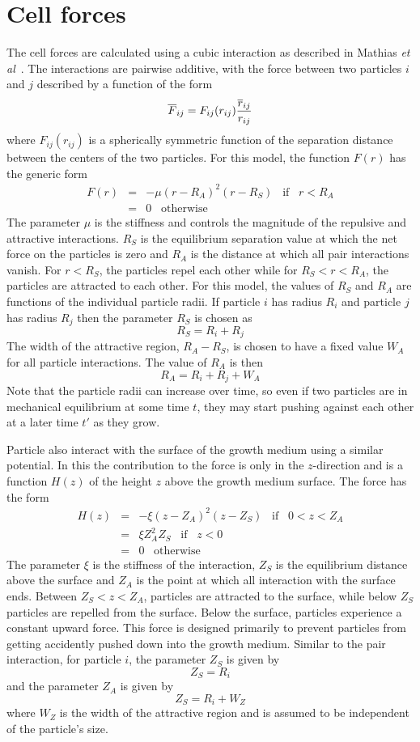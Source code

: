 \documentclass[12pt]{article}
\begin{document}
\section{Cell forces}
The cell forces are calculated using a cubic interaction as described in Mathias
{\em et al}~\cite{Mathias}. The interactions are pairwise
additive, with the force between two particles $i$ and $j$ described by a function of the form
\[
\overline{F}_{ij} = F_{ij}(r_{ij})\frac{\overline{r}_{ij}}{r_{ij}}
\]
where $F_{ij}(r_{ij})$ is a spherically symmetric function of the separation distance between the
centers of the two particles. For this model, the function $F(r)$ has the generic form
\begin{eqnarray*}
F(r) &=& -\mu(r-R_A)^2(r-R_S)\;\;\;\mbox{if}\;\;\;r<R_A \\
& = & 0\;\;\; \mbox{otherwise}
\end{eqnarray*}
The parameter $\mu$ is the stiffness and controls the magnitude of the repulsive and attractive
interactions. $R_S$ is the equilibrium separation value at which the net force on the particles is zero
and $R_A$ is the distance at which all pair interactions vanish. For $r<R_S$, the particles repel each
other while for $R_S<r<R_A$, the particles are attracted to each other. For this model, the values of
$R_S$ and $R_A$ are functions of the individual particle radii. If particle $i$ has radius $R_i$ and
particle $j$ has radius $R_j$ then the parameter $R_S$ is chosen as
\[
R_S = R_i+R_j
\]
The width of the attractive region, $R_A-R_S$, is chosen to have a fixed value $W_A$ for all particle
interactions. The value of $R_A$ is then
\[
R_A = R_i+R_j +W_A
\]
Note that the particle radii can increase over time, so even if two particles are in mechanical
equilibrium at some time $t$, they may start pushing against each other at a later time $t'$ as they
grow.

Particle also interact with the surface of the growth medium using a similar potential. In this
the contribution to the force is only in the $z$-direction and is a function $H(z)$ of the height $z$ above
the growth medium surface. The force has the form
\begin{eqnarray*}
H(z) & = & -\xi (z-Z_A)^2(z-Z_S)\;\;\;\mbox{if}\;\;\;0<z<Z_A \\
& = & \xi Z_A^2Z_S\;\;\;\mbox{if}\;\;\;z<0 \\
& = & 0\;\;\;\mbox{otherwise}
\end{eqnarray*}
The parameter $\xi$ is the stiffness of the interaction, $Z_S$ is the equilibrium distance above the surface
and $Z_A$ is the point at which all interaction with the surface ends. Between $Z_S<z<Z_A$, particles are
attracted to the surface, while below $Z_S$ particles are repelled from the surface. Below the surface,
particles experience a constant upward force. This force is designed primarily to prevent particles from
getting accidently pushed down into the growth medium. Similar to the pair interaction, for particle $i$,
the parameter $Z_S$ is given by
\[
Z_S = R_i
\]
and the parameter $Z_A$ is given by
\[
Z_S = R_i + W_Z
\]
where $W_Z$ is the width of the attractive region and is assumed to be independent of the particle's size.
\end{document}
